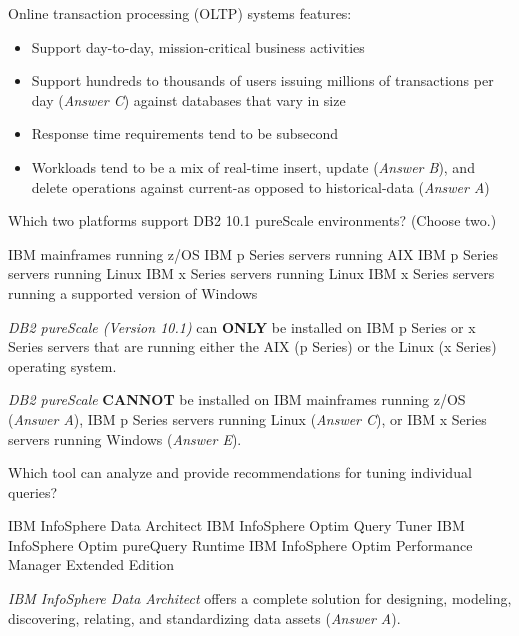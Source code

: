 \documentclass[answers, 11pt]{exam}
\begin{document}
\begin{questions}
\begin{solution}
Online transaction processing (OLTP) systems features:
\begin{itemize}
\item Support day-to-day, mission-critical business activities
\item Support hundreds to thousands of users issuing millions of transactions per day (\textit{Answer C})
against databases that vary in size
\item Response time requirements tend to be subsecond
\item Workloads tend to be a mix of real-time insert, update (\textit{Answer B}), and delete
operations against current-as opposed to historical-data (\textit{Answer A})
\end{itemize}

\end{solution}

\question[1]
Which two platforms support DB2 10.1 pureScale environments? (Choose two.)
\begin{choices}
\choice IBM mainframes running z/OS
\CorrectChoice IBM p Series servers running AIX
\choice IBM p Series servers running Linux
\CorrectChoice IBM x Series servers running Linux
\choice IBM x Series servers running a supported version of Windows
\end{choices}

\begin{solution}
\textit{DB2 pureScale (Version 10.1)} can \textbf{ONLY} be installed on IBM p Series or x Series
servers that are running either the AIX (p Series) or the Linux (x Series) operating system.
\par

\textit{DB2 pureScale} \textbf{CANNOT} be installed on IBM mainframes running z/OS (\textit{Answer A}),
IBM p Series servers running Linux (\textit{Answer C}), or IBM x Series servers running Windows
(\textit{Answer E}).

\end{solution}

\question[1]
Which tool can analyze and provide recommendations for tuning individual queries?
\begin{choices}
\choice IBM InfoSphere Data Architect
\CorrectChoice IBM InfoSphere Optim Query Tuner
\choice IBM InfoSphere Optim pureQuery Runtime
\choice IBM InfoSphere Optim Performance Manager Extended Edition
\end{choices}

\begin{solution}
\textit{IBM InfoSphere Data Architect} offers a complete solution for designing, modeling,
discovering, relating, and standardizing data assets (\textit{Answer A}).
\par


\end{solution}
\end{questions}
\end{document}
